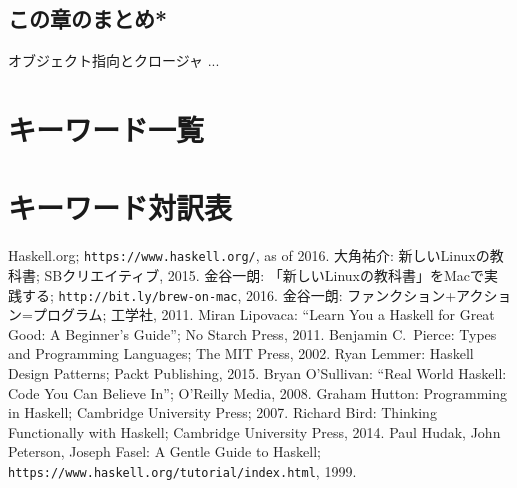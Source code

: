 \documentclass[a5paper,twoside,fleqn,draft]{jsbook}
\begin{document}
\section{この章のまとめ*}

\begin{note}{オブジェクト指向とクロージャ}
...
\end{note}


\chapter*{キーワード一覧}
\label{ch:keywords}

\chapter*{キーワード対訳表}


\begin{thebibliography}{99}
 Haskell.org;
  \texttt{https://www.haskell.org/}, as of 2016.
 大角祐介: 新しいLinuxの教科書; SBクリエイティブ, 2015.
 金谷一朗: 「新しいLinuxの教科書」をMacで実践する;
  \texttt{http://bit.ly/brew-on-mac}, 2016.
 金谷一朗: ファンクション+アクション=プログラム; 工学社,
  2011.
Miran Lipovaca: ``Learn You a Haskell for Great
  Good: A Beginner's Guide''; No Starch Press, 2011.
 Benjamin C.~Pierce: Types and Programming Languages;
  The MIT Press, 2002.
 Ryan Lemmer: Haskell Design Patterns; Packt
  Publishing, 2015.
 Bryan O'Sullivan: ``Real World Haskell: Code You
  Can Believe In''; O'Reilly Media, 2008.
 Graham Hutton: Programming in Haskell; Cambridge
  University Press; 2007.
 Richard Bird: Thinking Functionally with
  Haskell; Cambridge University Press, 2014.
 Paul Hudak, John Peterson, Joseph Fasel: A Gentle
  Guide to Haskell;
  \texttt{https://www.haskell.org/tutorial/index.html}, 1999.
\end{thebibliography}
\end{document}
